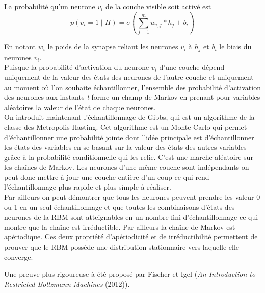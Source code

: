 \documentclass[a4paper,oneside]{report}
\begin{document}
                La probabilité qu'un neurone \begin{math}v_{i}\end{math} de la
                couche visible soit activé est \begin{equation}p( v_{i} =1 \mid H) = 
\sigma(\sum_{j=1}^{m} w_{i,j} * h_{j} + b_{i}) \end{equation}

				En notant \textit{$w_{i}$} le poids de la synapse reliant les neurones \textit{$v_{i}$} 
à \textit{$h_{j}$} et \textit{$b_{i}$} le biais du neurones \textit{$v_{i}$}.\\
        
					Puisque la probabilité  d'activation du neurone \textit{$v_{i}$} d'une couche dépend 
uniquement de la valeur des états des neurones de l'autre couche et uniquement au 
moment où l'on souhaite 
échantillonner, l'ensemble des probabilité d'activation des neurones aux instants \textit{t} forme 
un champ de Markov en prenant pour variables aléatoires la valeur de l'état de chaque neurones.\\


                On introduit maintenant l'échantillonnage de Gibbs, qui est un
                algorithme de la classe des Metropolis-Hasting. Cet algorithme
               est un Monte-Carlo qui permet d'échantillonner une probabilité jointe dont l'idée principale
                est d'échantillonner les états des variables en se basant sur la valeur des états
                des autres variables grâce à la probabilité conditionnelle qui les relie. C'est une marche aléatoire sur les chaînes de Markov.
Les neurones d'une même couche sont indépendants on peut donc mettre à jour une couche 
entière d'un coup ce qui rend l'échantillonnage plus rapide et plus simple à réaliser. \\

           Par ailleurs on peut démontrer que tous les neurones peuvent prendre les valeur 0 ou 1
 en un seul échantillonnage et que toutes les combinaisons d'états des neurones de la RBM 
sont atteignables en un nombre fini d'échantillonnage ce qui montre que la chaîne est irréductible. Par ailleurs la chaîne de Markov est apériodique. 
Ces deux propriété d'apériodicité et de irréductibilité permettent de prouver que le RBM
 possède une distribution stationnaire vers laquelle elle converge. 

               Une preuve plus rigoureuse à été proposé par Fischer et Igel (\textit{An Introduction to Restricted Boltzmann Machines} (2012)).\\
\end{document}
